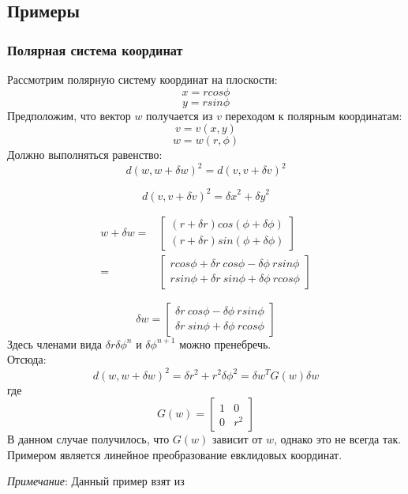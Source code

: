 \documentclass[a4paper,12pt]{article}
\begin{document}
\newpage

\subsection{Примеры}
\subsubsection{Полярная система координат}
Рассмотрим полярную систему координат на плоскости:
$$ x = r cos \phi $$
$$ y = r sin \phi $$
Предположим, что вектор $w$ получается из $v$ переходом к полярным координатам:
$$ v = v(x, y) $$
$$ w = w(r, \phi) $$
Должно выполняться равенство:
$$d(w, w + \delta w)^2 = d(v, v + \delta v)^2$$

$$d(v, v + \delta v)^2 = {\delta x}^2 + {\delta y}^2$$

$$
\begin{aligned}
w + \delta w  
    = & \begin{bmatrix} 
        (r + \delta r) cos (\phi + \delta \phi) \\
        (r + \delta r) sin (\phi + \delta \phi) 
    \end{bmatrix} \\
    =   & \begin{bmatrix}
        r cos \phi + \delta r ~ cos \phi - \delta \phi ~ r sin \phi \\
        r sin \phi + \delta r ~ sin \phi + \delta \phi ~ r cos \phi
    \end{bmatrix}
\end{aligned}
$$

$$
\delta w = 
\left[ 
    \begin{aligned} 
        \delta r ~ cos \phi - \delta \phi ~ r sin \phi \\
        \delta r ~ sin \phi + \delta \phi ~ r cos \phi
    \end{aligned}
\right]
$$
Здесь членами вида $\delta r \delta \phi^n$ и $\delta \phi^{n+1}$ можно пренебречь. \\
Отсюда: 
$$d(w, w + \delta w)^2 = \delta r^2 + r^2 \delta \phi^2 = \delta w^TG(w)\delta w$$
где
$$
G(w) = 
\begin{bmatrix}
    1 & 0 \\
    0 & r^2
\end{bmatrix}
$$ \label{PolarTensor}
В данном случае получилось, что $G(w)$ зависит от $w$, однако это не всегда так. Примером является линейное преобразование евклидовых координат.

\emph{Примечание}:
    Данный пример взят из \cite{AmariWhy}
\end{document}

